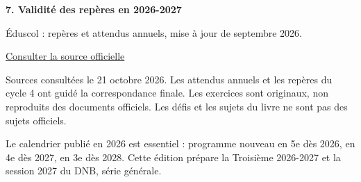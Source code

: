 \par\medskip\textbf{7. Validité des repères en 2026-2027}\par Éduscol : repères et attendus annuels, mise à jour de septembre 2026.\par\href{https://eduscol.education.gouv.fr/6910/reperes-annuels-de-progression-et-attendus-de-fin-d-annee-du-cp-la-troisieme}{\textcolor{otGreenDark}{Consulter la source officielle}}\par
\par\bigskip Sources consultées le 21 octobre 2026. Les attendus annuels et les
repères du cycle 4 ont guidé la correspondance finale. Les exercices sont
originaux, non reproduits des documents officiels. Les défis et les sujets
du livre ne sont pas des sujets officiels.\par\medskip
Le calendrier publié en 2026 est essentiel : programme nouveau en 5e dès
2026, en 4e dès 2027, en 3e dès 2028. Cette édition prépare la Troisième
2026-2027 et la session 2027 du DNB, série générale.

\clearpage
